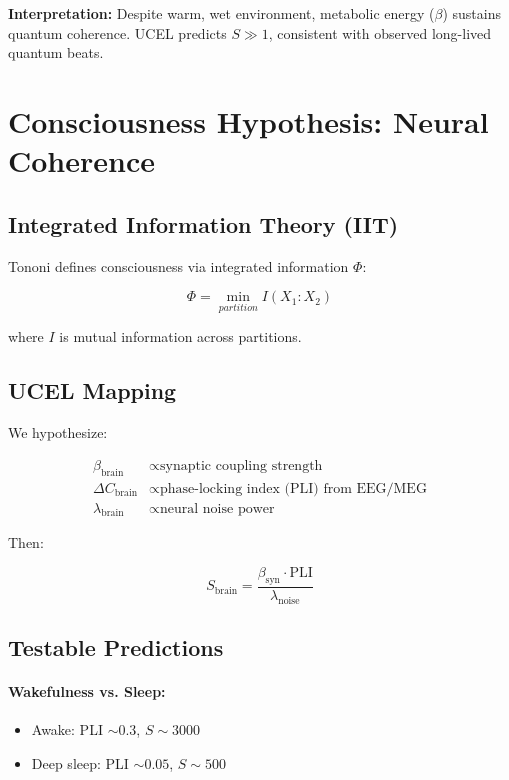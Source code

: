 \documentclass[12pt,a4paper]{article}
\begin{document}
\textbf{Interpretation:} Despite warm, wet environment, metabolic energy ($\beta$) sustains quantum coherence. UCEL predicts $S \gg 1$, consistent with observed long-lived quantum beats.

\section{Consciousness Hypothesis: Neural Coherence}

\subsection{Integrated Information Theory (IIT)}

Tononi defines consciousness via integrated information $\Phi$:

\begin{equation}
\Phi = \min_{partition} I(X_1 : X_2)
\tag{S25}
\end{equation}

where $I$ is mutual information across partitions.

\subsection{UCEL Mapping}

We hypothesize:

\begin{align}
\beta_{\text{brain}} &\propto \text{synaptic coupling strength} \\
\Delta C_{\text{brain}} &\propto \text{phase-locking index (PLI) from EEG/MEG} \\
\lambda_{\text{brain}} &\propto \text{neural noise power}
\tag{S26}
\end{align}

Then:

\begin{equation}
S_{\text{brain}} = \frac{\beta_{\text{syn}} \cdot \text{PLI}}{\lambda_{\text{noise}}}
\tag{S27}
\end{equation}

\subsection{Testable Predictions}

\paragraph{Wakefulness vs. Sleep:}
\begin{itemize}
    \item Awake: PLI $\sim 0.3$, $S \sim 3000$
    \item Deep sleep: PLI $\sim 0.05$, $S \sim 500$
\end{itemize}
\end{document}
